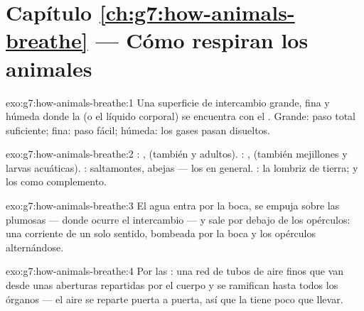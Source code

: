 \section*{Capítulo \ref{ch:g7:how-animals-breathe} --- Cómo respiran los animales}

\begin{solution}{exo:g7:how-animals-breathe:1}
Una superficie de intercambio grande, fina y húmeda donde la  (o
el líquido corporal) se encuentra con el . Grande: paso total
suficiente; fina: paso fácil; húmeda: los gases pasan disueltos.
\end{solution}

\begin{solution}{exo:g7:how-animals-breathe:2}
: ,  (también  y  adultos).
: ,  (también mejillones y larvas acuáticas).
: saltamontes, abejas --- los  en general. : la lombriz de tierra; y los  como complemento.
\end{solution}

\begin{solution}{exo:g7:how-animals-breathe:3}
El agua entra por la boca, se empuja sobre las  plumosas ---
donde ocurre el intercambio --- y sale por debajo de los opérculos: una
corriente de un solo sentido, bombeada por la boca y los opérculos
alternándose.
\end{solution}

\begin{solution}{exo:g7:how-animals-breathe:4}
Por las : una red de tubos de aire finos que van desde unas
aberturas repartidas por el cuerpo y se ramifican hasta todos los
órganos --- el aire se reparte puerta a puerta, así que la  tiene
poco que llevar.
\end{solution}

